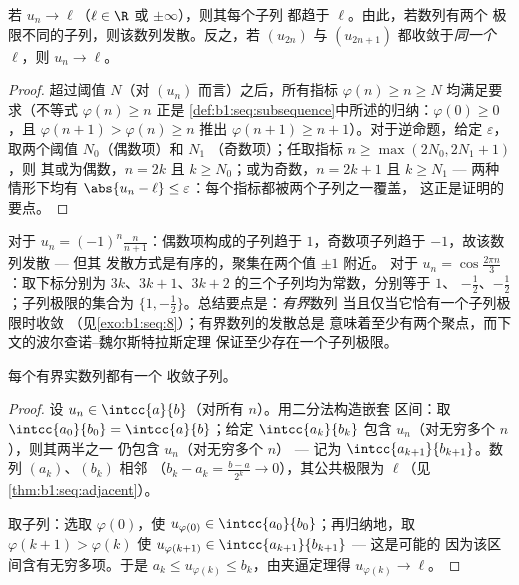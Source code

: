 \begin{proposition}\label{prop:b1:seq:subsequences}
若 $u_n \to \ell$（$\ell \in \R$ 或 $\pm\infty$），则其每个子列
都趋于 $\ell$。由此，若数列有两个
极限不同的子列，则该数列发散。反之，若 $(u_{2n})$ 与
$(u_{2n+1})$ 都收敛于\emph{同一个} $\ell$，则 $u_n \to
\ell$。
\end{proposition}

\begin{proof}
超过阈值 $N$（对 $(u_n)$ 而言）之后，所有指标 $\varphi(n) \geq n
\geq N$ 均满足要求（不等式 $\varphi(n) \geq n$ 正是
\cref{def:b1:seq:subsequence}中所述的归纳：$\varphi(0)
\geq 0$，且 $\varphi(n+1) > \varphi(n) \geq n$ 推出
$\varphi(n+1) \geq n + 1$）。对于逆命题，给定
$\varepsilon$，取两个阈值 $N_0$（偶数项）和 $N_1$
（奇数项）；任取指标 $n \geq \max(2N_0, 2N_1 + 1)$，则
其或为偶数，$n = 2k$ 且 $k \geq N_0$；或为奇数，$n = 2k+1$ 且
$k \geq N_1$ --- 两种情形下均有 $\abs{u_n - \ell} \leq
\varepsilon$：每个指标都被两个子列之一覆盖，
这正是证明的要点。
\end{proof}

\begin{example}[子列极限]\label{ex:b1:seq:sublimits}
对于 $u_n = (-1)^n \frac{n}{n+1}$：偶数项构成的子列趋于
$1$，奇数项子列趋于 $-1$，故该数列发散 --- 但其
发散方式是有序的，聚集在两个值 $\pm 1$ 附近。
对于 $u_n = \cos\frac{2\pi n}{3}$：取下标分别为
$3k$、$3k + 1$、$3k + 2$ 的三个子列均为常数，分别等于 $1$、
$-\frac12$、$-\frac12$；子列极限的集合为 $\{1,
-\frac12\}$。总结要点是：\emph{有界}数列
当且仅当它恰有一个子列极限时收敛
（见\cref{exo:b1:seq:8}）；有界数列的发散总是
意味着至少有两个聚点，而下文的波尔查诺--魏尔斯特拉斯定理
保证至少存在一个子列极限。
\end{example}

\begin{theorem}\label{thm:b1:seq:bw}
每个有界实数列都有一个
收敛子列。
\end{theorem}

\begin{proof}
设 $u_n \in \intcc{a}{b}$（对所有 $n$）。用二分法构造嵌套
区间：取 $\intcc{a_0}{b_0} = \intcc{a}{b}$；给定
$\intcc{a_k}{b_k}$ 包含 $u_n$（对无穷多个 $n$），则其两半之一
仍包含 $u_n$（对无穷多个 $n$） --- 记为
$\intcc{a_{k+1}}{b_{k+1}}$。数列 $(a_k)$、$(b_k)$ 相邻
（$b_k - a_k = \frac{b-a}{2^k} \to 0$），其公共极限为
$\ell$（见\cref{thm:b1:seq:adjacent}）。

取子列：选取 $\varphi(0)$，使 $u_{\varphi(0)} \in
\intcc{a_0}{b_0}$；再归纳地，取 $\varphi(k+1) > \varphi(k)$
使 $u_{\varphi(k+1)} \in \intcc{a_{k+1}}{b_{k+1}}$ --- 这是可能的
因为该区间含有无穷多项。于是 $a_k \leq
u_{\varphi(k)} \leq b_k$，由夹逼定理得
$u_{\varphi(k)} \to \ell$。
\end{proof}

